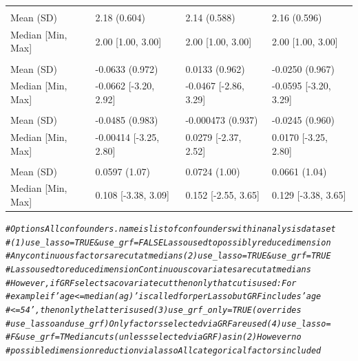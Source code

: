\documentclass[smallextended]{svjour3}
\makeatletter
\newcommand{\hlcom}[1]{\textcolor[rgb]{0.678,0.584,0.686}{\textit{#1}}}%
\newenvironment{kframe}{%
 \def\at@end@of@kframe{}%
 \ifinner\ifhmode%
  \def\at@end@of@kframe{\end{minipage}}%
  \begin{minipage}{\columnwidth}%
 \fi\fi%
 \def\FrameCommand##1{\hskip\@totalleftmargin \hskip-\fboxsep
 \colorbox{shadecolor}{##1}\hskip-\fboxsep
     \hskip-\linewidth \hskip-\@totalleftmargin \hskip\columnwidth}%
 \MakeFramed {\advance\hsize-\width
   \@totalleftmargin\z@ \linewidth\hsize
   \@setminipage}}%
 {\par\unskip\endMakeFramed%
 \at@end@of@kframe}
\newenvironment{knitrout}{}{} %
\makeatother
\begin{document}
\begin{knitrout}
\begin{tabular}[t]{llll}
\addlinespace[0.3em]
\multicolumn{4}{l}{\textbf{grade}}\\
\hspace{1em}Mean (SD) & 2.18 (0.604) & 2.14 (0.588) & 2.16 (0.596)\\
\hspace{1em}Median [Min, Max] & 2.00 [1.00, 3.00] & 2.00 [1.00, 3.00] & 2.00 [1.00, 3.00]\\
\addlinespace[0.3em]
\multicolumn{4}{l}{\textbf{noise1}}\\
\hspace{1em}Mean (SD) & -0.0633 (0.972) & 0.0133 (0.962) & -0.0250 (0.967)\\
\hspace{1em}Median [Min, Max] & -0.0662 [-3.20, 2.92] & -0.0467 [-2.86, 3.29] & -0.0595 [-3.20, 3.29]\\
\addlinespace[0.3em]
\multicolumn{4}{l}{\textbf{noise2}}\\
\hspace{1em}Mean (SD) & -0.0485 (0.983) & -0.000473 (0.937) & -0.0245 (0.960)\\
\hspace{1em}Median [Min, Max] & -0.00414 [-3.25, 2.80] & 0.0279 [-2.37, 2.52] & 0.0170 [-3.25, 2.80]\\
\addlinespace[0.3em]
\multicolumn{4}{l}{\textbf{noise3}}\\
\hspace{1em}Mean (SD) & 0.0597 (1.07) & 0.0724 (1.00) & 0.0661 (1.04)\\
\hspace{1em}Median [Min, Max] & 0.108 [-3.38, 3.09] & 0.152 [-2.55, 3.65] & 0.129 [-3.38, 3.65]\\
\bottomrule
\end{tabular}

\begin{kframe}\begin{alltt}
\hlcom{# Options Allconfounders.name is list of confounders within analysis dataset}
\hlcom{# (1) use_lasso=TRUE & use_grf=FALSE Lasso used to possibly reduce dimension}
\hlcom{# Any continuous factors are cut at medians (2) use_lasso=TRUE & use_grf=TRUE}
\hlcom{# Lasso used to reduce dimension Continuous covariates are cut at medians}
\hlcom{# However, if GRF selects a covariate cut then only that cut is used: For}
\hlcom{# example if 'age <= median(ag)' is called for per Lasso but GRF includes 'age}
\hlcom{# <= 54', then only the latter is used (3) use_grf_only = TRUE (overrides}
\hlcom{# use_lasso and use_grf) Only factors selected via GRF are used (4) use_lasso =}
\hlcom{# F & use_grf =T Median cuts (unless selected via GRF) as in (2) However no}
\hlcom{# possible dimension reduction via lasso All categorical factors included}


\end{alltt}
\end{kframe}
\end{knitrout}
\end{document}
